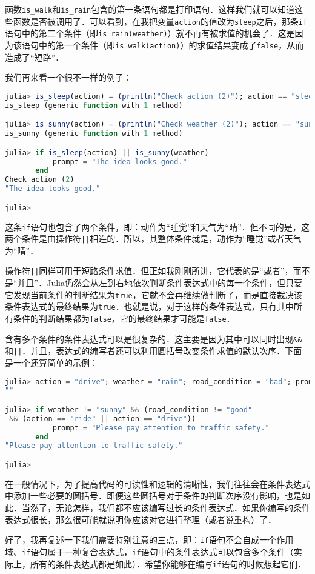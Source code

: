 函数\verb|is_walk|和\verb|is_rain|包含的第一条语句都是打印语句．这样我们就可以知道这些函数是否被调用了．可以看到，在我把变量\verb|action|的值改为\verb|sleep|之后，那条\verb|if|语句中的第二个条件（即\verb|is_rain(weather)|）就不再有被求值的机会了．这是因为该语句中的第一个条件（即\verb|is_walk(action)|）的求值结果变成了\verb|false|，从而造成了“短路”．

我们再来看一个很不一样的例子：

\begin{lstlisting}[language=julia]
julia> is_sleep(action) = (println("Check action (2)"); action == "sleep")
is_sleep (generic function with 1 method)

julia> is_sunny(action) = (println("Check weather (2)"); action == "sunny")
is_sunny (generic function with 1 method)

julia> if is_sleep(action) || is_sunny(weather)
           prompt = "The idea looks good."
       end
Check action (2)
"The idea looks good."

julia> 
\end{lstlisting}

这条\verb|if|语句也包含了两个条件，即：动作为“睡觉”和天气为“晴”．但不同的是，这两个条件是由操作符\verb`||`相连的．所以，其整体条件就是，动作为“睡觉”或者天气为“晴”．

操作符\verb`||`同样可用于短路条件求值．但正如我刚刚所讲，它代表的是“或者”，而不是“并且”．Julia仍然会从左到右地依次判断条件表达式中的每一个条件，但只要它发现当前条件的判断结果为\verb|true|，它就不会再继续做判断了，而是直接裁决该条件表达式的最终结果为\verb|true|．也就是说，对于这样的条件表达式，只有其中所有条件的判断结果都为\verb|false|，它的最终结果才可能是\verb|false|．

含有多个条件的条件表达式可以是很复杂的．这主要是因为其中可以同时出现\verb`&&`和\verb`||`．并且，表达式的编写者还可以利用圆括号改变条件求值的默认次序．下面是一个还算简单的示例：

\begin{lstlisting}[language=julia]
julia> action = "drive"; weather = "rain"; road_condition = "bad"; prompt = ""
""

julia> if weather != "sunny" && (road_condition != "good"
 && (action == "ride" || action == "drive"))
           prompt = "Please pay attention to traffic safety."
       end
"Please pay attention to traffic safety."

julia> 
\end{lstlisting}

在一般情况下，为了提高代码的可读性和逻辑的清晰性，我们往往会在条件表达式中添加一些必要的圆括号．即便这些圆括号对于条件的判断次序没有影响，也是如此．当然了，无论怎样，我们都不应该编写过长的条件表达式．如果你编写的条件表达式很长，那么很可能就说明你应该对它进行整理（或者说重构）了．

好了，我再复述一下我们需要特别注意的三点，即：\verb`if`语句不会自成一个作用域、\verb`if`语句属于一种复合表达式，\verb`if`语句中的条件表达式可以包含多个条件（实际上，所有的条件表达式都是如此）．希望你能够在编写\verb`if`语句的时候想起它们．